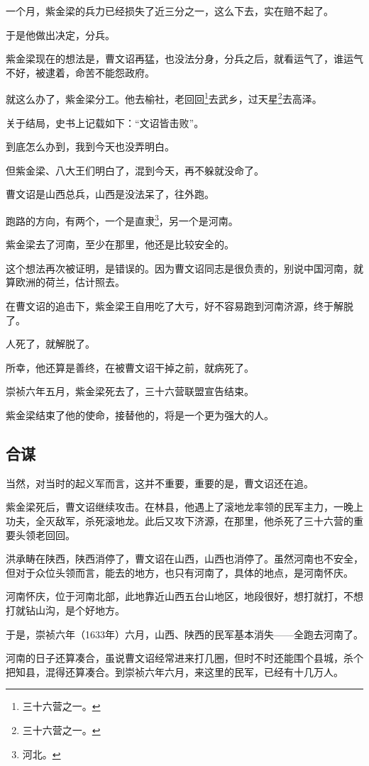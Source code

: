 \begin{multicols}{\theparacolNo}
一个月，紫金梁的兵力已经损失了近三分之一，这么下去，实在赔不起了。

于是他做出决定，分兵。

紫金梁现在的想法是，曹文诏再猛，也没法分身，分兵之后，就看运气了，谁运气不好，被逮着，命苦不能怨政府。

就这么办了，紫金梁分工。他去榆社，老回回\footnote{三十六营之一。}去武乡，过天星\footnote{三十六营之一。}去高泽。

关于结局，史书上记载如下：“文诏皆击败”。

到底怎么办到，我到今天也没弄明白。

但紫金梁、八大王们明白了，混到今天，再不躲就没命了。

曹文诏是山西总兵，山西是没法呆了，往外跑。

跑路的方向，有两个，一个是直隶\footnote{河北。}，另一个是河南。

紫金梁去了河南，至少在那里，他还是比较安全的。

这个想法再次被证明，是错误的。因为曹文诏同志是很负责的，别说中国河南，就算欧洲的荷兰，估计照去。

在曹文诏的追击下，紫金梁王自用吃了大亏，好不容易跑到河南济源，终于解脱了。

人死了，就解脱了。

所幸，他还算是善终，在被曹文诏干掉之前，就病死了。

崇祯六年五月，紫金梁死去了，三十六营联盟宣告结束。

紫金梁结束了他的使命，接替他的，将是一个更为强大的人。

\subsection{合谋}
当然，对当时的起义军而言，这并不重要，重要的是，曹文诏还在追。

紫金梁死后，曹文诏继续攻击。在林县，他遇上了滚地龙率领的民军主力，一晚上功夫，全灭敌军，杀死滚地龙。此后又攻下济源，在那里，他杀死了三十六营的重要头领老回回。

洪承畴在陕西，陕西消停了，曹文诏在山西，山西也消停了。虽然河南也不安全，但对于众位头领而言，能去的地方，也只有河南了，具体的地点，是河南怀庆。

河南怀庆，位于河南北部，此地靠近山西五台山地区，地段很好，想打就打，不想打就钻山沟，是个好地方。

于是，崇祯六年（1633年）六月，山西、陕西的民军基本消失——全跑去河南了。

河南的日子还算凑合，虽说曹文诏经常进来打几圈，但时不时还能围个县城，杀个把知县，混得还算凑合。到崇祯六年六月，来这里的民军，已经有十几万人。


\end{multicols}
